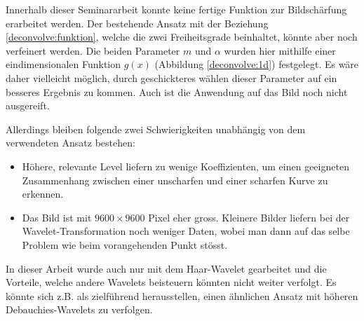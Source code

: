 Innerhalb dieser Seminararbeit konnte keine fertige Funktion zur Bildschärfung erarbeitet werden.
Der bestehende Ansatz mit der Beziehung \eqref{deconvolve:funktion}, welche die zwei Freiheitsgrade beinhaltet, könnte aber noch verfeinert werden.
Die beiden Parameter $m$ und $\alpha$ wurden hier mithilfe einer eindimensionalen Funktion $g(x)$ (Abbildung \ref{deconvolve:1d}) festgelegt.
Es wäre daher vielleicht möglich, durch geschickteres wählen dieser Parameter auf ein besseres Ergebnis zu kommen.
Auch ist die Anwendung auf das Bild noch nicht ausgereift.

Allerdings bleiben folgende zwei Schwierigkeiten unabhängig von dem verwendeten Ansatz bestehen:
\begin{itemize}
	\item Höhere, relevante Level liefern zu wenige Koeffizienten, um einen geeigneten Zusammenhang zwischen einer unscharfen und einer scharfen Kurve zu erkennen.
	\item Das Bild ist mit $9600\times9600$ Pixel eher gross. Kleinere Bilder liefern bei der Wavelet-Transformation noch weniger Daten, wobei man dann auf das selbe Problem wie beim vorangehenden Punkt stösst.
\end{itemize}

In dieser Arbeit wurde auch nur mit dem Haar-Wavelet gearbeitet und die Vorteile, welche andere Wavelets beisteuern könnten nicht weiter verfolgt.
Es könnte sich z.B. als zielführend herausstellen, einen ähnlichen Ansatz mit höheren Debauchies-Wavelets zu verfolgen.

